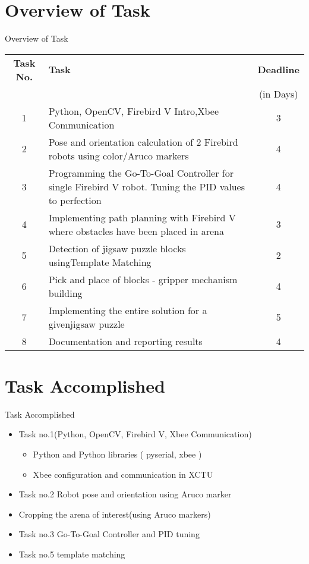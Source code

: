 \documentclass[10pt, a4paper]{beamer}
\begin{document}
\section{Overview of Task}
\begin{frame}{Overview of Task}
	\begin{tabular}{| c | p{18 em} | c |}\hline
	\textbf{Task No.} & \hspace{7em}\textbf{Task} & \textbf{Deadline} \\
	& & (in Days)\\\hline
	1 &\small{ Python, OpenCV, Firebird V Intro,\hspace{5 em}Xbee Communication} & 3 \\\hline
	2 &\small{ Pose and orientation calculation of 2 Firebird robots using color/Aruco markers }& 4\\\hline
	3 &\small{ Programming the Go-To-Goal Controller for single Firebird V robot. Tuning the PID\hspace{3 em} values to perfection }& 4\\\hline
	4 &\small{ Implementing path planning with Firebird V where obstacles have been placed in arena }& 3\\\hline
	5 &\small{ Detection of jigsaw puzzle blocks using\hspace{3 em}Template Matching} & 2\\\hline
	6 &\small{ Pick and place of blocks - gripper mechanism building }& 4\\\hline
	7 &\small{ Implementing the entire solution for a given\hspace{3 em}jigsaw puzzle }& 5\\\hline
	8 &\small{ Documentation and reporting results }& 4\\\hline
	\end{tabular}
	
\end{frame}

\section{Task Accomplished}
\begin{frame}{Task Accomplished}
	\begin{itemize}
		\item Task no.1(Python, OpenCV, Firebird V, Xbee Communication)
		\begin{itemize}
		\item Python and Python libraries ( pyserial, xbee )
		\item Xbee configuration and communication in XCTU
		\end{itemize}
		\item Task no.2  Robot pose and orientation using Aruco marker
		\item Cropping the arena of interest(using Aruco markers)
		\item Task no.3 Go-To-Goal Controller and PID tuning
		\item Task no.5 template matching
		
	\end{itemize}
\end{frame}
\end{document}
